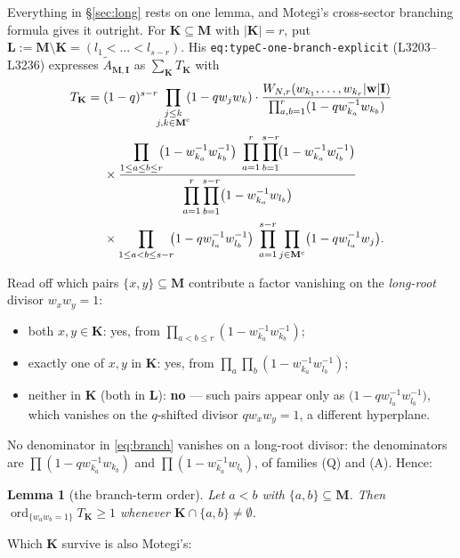 \documentclass[11pt]{article}
\theoremstyle{plain}
\newtheorem{lem}[thm]{Lemma}
\theoremstyle{definition}
\theoremstyle{remark}
\theoremstyle{plain}
\newcommand{\bI}{\mathbf{I}}
\newcommand{\bM}{\mathbf{M}}
\newcommand{\bK}{\mathbf{K}}
\newcommand{\bL}{\mathbf{L}}
\newcommand{\bw}{\mathbf{w}}
\newcommand{\At}{\widetilde{A}}
\newcommand{\ord}{\operatorname{ord}}
\begin{document}
Everything in \S\ref{sec:long} rests on one lemma, and Motegi's cross-sector
branching formula gives it outright.  For $\bK\subseteq\bM$ with $|\bK|=r$, put
$\bL:=\bM\setminus\bK=(l_1<\dots<l_{s-r})$.  His
\texttt{eq:typeC-one-branch-explicit} (L3203--L3236) expresses $\At_{\bM,\bI}$
as $\sum_{\bK}T_{\bK}$ with
\begin{align}
T_{\bK}=\;&(1-q)^{s-r}\!\!\prod_{\substack{j\le k\\ j,k\in\bM^{\mathrm c}}}\!\!(1-qw_jw_k)\cdot
\frac{W_{N,r}(w_{k_1},\dots,w_{k_r}|\bw|\bI)}{\prod_{a,b=1}^{r}(1-qw_{k_a}^{-1}w_{k_b})}
\notag\\
&\times
\frac{\displaystyle\prod_{1\le a\le b\le r}\!\!\bigl(1-w_{k_a}^{-1}w_{k_b}^{-1}\bigr)\;
\prod_{a=1}^{r}\prod_{b=1}^{s-r}\!\bigl(1-w_{k_a}^{-1}w_{l_b}^{-1}\bigr)}
{\displaystyle\prod_{a=1}^{r}\prod_{b=1}^{s-r}\bigl(1-w_{k_a}^{-1}w_{l_b}\bigr)}
\notag\\
&\times
\prod_{1\le a<b\le s-r}\!\!\bigl(1-qw_{l_a}^{-1}w_{l_b}^{-1}\bigr)\;
\prod_{a=1}^{s-r}\prod_{j\in\bM^{\mathrm c}}\bigl(1-qw_{l_a}^{-1}w_j\bigr).
\label{eq:branch}
\end{align}

Read off which pairs $\{x,y\}\subseteq\bM$ contribute a factor vanishing on the
\emph{long-root} divisor $w_xw_y=1$:
\begin{itemize}
\item both $x,y\in\bK$: yes, from $\prod_{a<b\le r}(1-w_{k_a}^{-1}w_{k_b}^{-1})$;
\item exactly one of $x,y$ in $\bK$: yes, from
$\prod_{a}\prod_{b}(1-w_{k_a}^{-1}w_{l_b}^{-1})$;
\item neither in $\bK$ (both in $\bL$): \textbf{no} --- such pairs appear only as
$\bigl(1-qw_{l_a}^{-1}w_{l_b}^{-1}\bigr)$, which vanishes on the $q$-shifted
divisor $qw_xw_y=1$, a different hyperplane.
\end{itemize}
No denominator in \eqref{eq:branch} vanishes on a long-root divisor: the
denominators are $\prod(1-qw_{k_a}^{-1}w_{k_b})$ and
$\prod(1-w_{k_a}^{-1}w_{l_b})$, of families (Q) and (A).  Hence:

\begin{lem}[the branch-term order]\label{lem:branchord}
Let $a<b$ with $\{a,b\}\subseteq\bM$.  Then $\ord_{\{w_aw_b=1\}}T_{\bK}\ge1$
whenever $\bK\cap\{a,b\}\ne\emptyset$.
\end{lem}

Which $\bK$ survive is also Motegi's:
\end{document}
